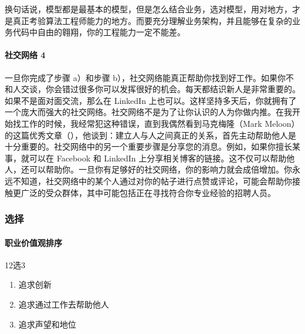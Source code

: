 \documentclass[letterpaper,11pt,english]{sphinxmanual}
\begin{document}
换句话说，模型都是最基本的模型，但是怎么结合业务，选对模型，用对地方，才是真正考验算法工程师能力的地方。而要充分理解业务架构，并且能够在复杂的业务代码中自由的翱翔，你的工程能力一定不能差。


\paragraph{社交网络 4\sphinxfootnotemark[754]}
\label{\detokenize{chapter_interview/xintai:id9}}%
\begin{footnotetext}[754]\sphinxAtStartFootnote
{}
%
\end{footnotetext}\ignorespaces 
一旦你完成了步骤 a）和步骤
b），社交网络能真正帮助你找到好工作。如果你不和人交谈，你会错过很多你可以发挥很好的机会。每天都结识新人是非常重要的。如果不是面对面交流，那么在
LinkedIn
上也可以。这样坚持多天后，你就拥有了一个庞大而强大的社交网络。社交网络不是为了让你认识的人为你做内推。在我开始找工作的时候，我经常犯这种错误，直到我偶然看到马克梅隆（Mark
Meloon）的这篇优秀文章（），他谈到：建立人与人之间真正的关系，首先主动帮助他人是十分重要的。社交网络中的另一个重要步骤是分享您的消息。例如，如果你擅长某事，就可以在
Facebook 和 LinkedIn
上分享相关博客的链接。这不仅可以帮助他人，还可以帮助你。一旦你有足够好的社交网络，你的影响力就会成倍增加。你永远不知道，社交网络中的某个人通过对你的帖子进行点赞或评论，可能会帮助你接触更广泛的受众群体，其中可能包括正在寻找符合你专业经验的招聘人员。


\subsubsection{选择}
\label{\detokenize{chapter_interview/choose:id1}}\label{\detokenize{chapter_interview/choose::doc}}

\paragraph{职业价值观排序}
\label{\detokenize{chapter_interview/choose:id2}}
12选3
%
\begin{footnote}[755]\sphinxAtStartFootnote
{}
%
\end{footnote}
\begin{enumerate}
%
\item {} 
追求创新

\item {} 
追求通过工作去帮助他人

\item {} 
追求声望和地位

\end{enumerate}
\end{document}
